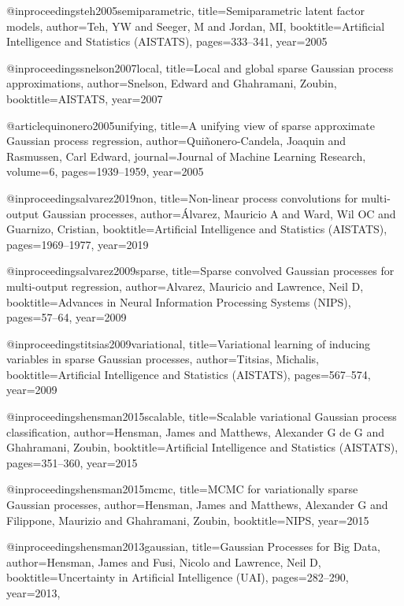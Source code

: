 \documentclass[]{article}
\begin{document}
@inproceedings{teh2005semiparametric,
	title={Semiparametric latent factor models},
	author={Teh, YW and Seeger, M and Jordan, MI},
	booktitle={Artificial Intelligence and Statistics (AISTATS)},
	pages={333--341},
	year={2005}
}

@inproceedings{snelson2007local,
	title={Local and global sparse {G}aussian process approximations},
	author={Snelson, Edward and Ghahramani, Zoubin},
	booktitle={AISTATS},
	year={2007}
}

@article{quinonero2005unifying,
	title={A unifying view of sparse approximate {G}aussian process regression},
	author={Qui{\~n}onero-Candela, Joaquin and Rasmussen, Carl Edward},
	journal={Journal of Machine Learning Research},
	volume={6},
	pages={1939--1959},
	year={2005}
}

@inproceedings{alvarez2019non,
	title={Non-linear process convolutions for multi-output {G}aussian processes},
	author={{\'A}lvarez, Mauricio A and Ward, Wil OC and Guarnizo, Cristian},
	booktitle={Artificial Intelligence and Statistics (AISTATS)},
	pages={1969--1977},
	year={2019}
}

@inproceedings{alvarez2009sparse,
	title={Sparse convolved {G}aussian processes for multi-output regression},
	author={Alvarez, Mauricio and Lawrence, Neil D},
	booktitle={Advances in Neural Information Processing Systems (NIPS)},
	pages={57--64},
	year={2009}
}

@inproceedings{titsias2009variational,
	title={Variational learning of inducing variables in sparse {G}aussian processes},
	author={Titsias, Michalis},
	booktitle={Artificial Intelligence and Statistics (AISTATS)},
	pages={567--574},
	year={2009}
}

@inproceedings{hensman2015scalable,
	title={Scalable variational {G}aussian process classification},
	author={Hensman, James and Matthews, Alexander G de G and Ghahramani, Zoubin},
	booktitle={Artificial Intelligence and Statistics (AISTATS)},
	pages={351--360},
	year={2015}
}

@inproceedings{hensman2015mcmc,
	title={{MCMC} for variationally sparse {G}aussian processes},
	author={Hensman, James and Matthews, Alexander G and Filippone, Maurizio and Ghahramani, Zoubin},
	booktitle={NIPS},
	year={2015}
}

@inproceedings{hensman2013gaussian,
	title={{G}aussian Processes for Big Data},
	author={Hensman, James and Fusi, Nicolo and Lawrence, Neil D},
	booktitle={Uncertainty in Artificial Intelligence (UAI)},
	pages={282--290},
	year={2013},
}
\end{document}
